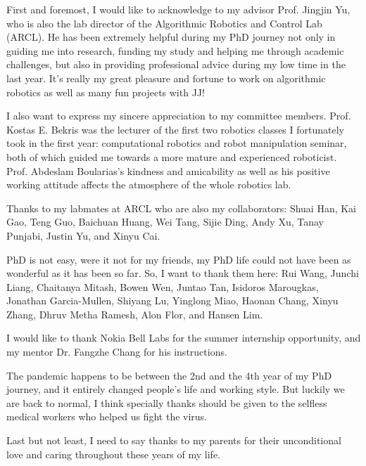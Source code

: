 
\begin{acknowledgments}
First and foremost, I would like to acknowledge to my advisor Prof. Jingjin Yu, 
who is also the lab director of the Algorithmic Robotics and Control Lab (ARCL). 
He has been extremely helpful during my PhD journey 
not only in guiding me into research, funding my study and helping me through academic challenges, 
but also in providing professional advice during my low time in the last year. 
It's really my great pleasure and fortune to work on algorithmic robotics 
as well as many fun projects with JJ! 

I also want to express my sincere appreciation to my committee members. 
Prof. Kostas E. Bekris was the lecturer of the first two robotics classes I fortunately took in the first year: 
computational robotics and robot manipulation seminar, both of which guided me 
towards a more mature and experienced roboticist. 
Prof. Abdeslam Boularias's kindness and amicability as well as his positive working attitude affects
the atmosphere of the whole robotics lab.

Thanks to my labmates at ARCL who are also my collaborators: Shuai Han, 
Kai Gao, Teng Guo, Baichuan Huang, Wei Tang, Sijie Ding, Andy Xu, Tanay Punjabi, 
Justin Yu, and Xinyu Cai. 

PhD is not easy, were it not for my friends, my PhD life 
could not have been as wonderful as it has been so far. 
So, I want to thank them here: Rui Wang, Junchi Liang, Chaitanya Mitash, Bowen Wen, Juntao Tan, 
Isidoros Marougkas, Jonathan Garcia-Mullen, Shiyang Lu, Yinglong Miao, Haonan Chang, Xinyu Zhang, 
Dhruv Metha Ramesh, Alon Flor, and Hansen Lim. 

I would like to thank Nokia Bell Labs for the summer internship opportunity,
and my mentor Dr. Fangzhe Chang for his instructions.

The pandemic happens to be between the 2nd and the 4th year of my PhD journey, 
and it entirely changed people's life and working style. 
But luckily we are back to normal, I think specially thanks should be given to the 
selfless medical workers who helped us fight the virus. 

Last but not least, I need to say thanks to my parents for their unconditional love 
and caring throughout these years of my life. 

\end{acknowledgments}
